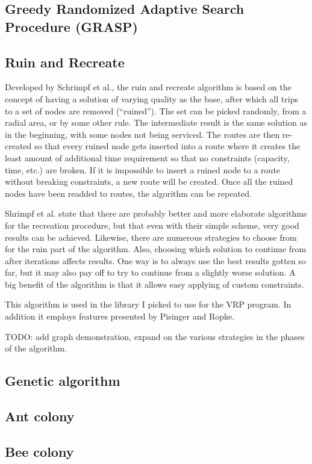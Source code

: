 \subsection{Greedy Randomized Adaptive Search Procedure (GRASP)}

\subsection {Ruin and Recreate}

\label{subsection:ruinandrecreate} 

Developed by Schrimpf et al., the ruin and recreate algorithm is based on the concept of having a solution of varying quality as the base, after which all trips to a set of nodes are removed (``ruined''). The set can be picked randomly, from a radial area, or by some other rule. The intermediate result is the same solution as in the beginning, with some nodes not being serviced. The routes are then re-created so that every ruined node gets inserted into a route where it creates the least amount of additional time requirement so that no constraints (capacity, time, etc.) are broken. If it is impossible to insert a ruined node to a route without breaking constraints, a new route will be created. Once all the ruined nodes have been readded to routes, the algorithm can be repeated. \cite{schrimpf2000record} 

Shrimpf et al. state that there are probably better and more elaborate algorithms for the recreation procedure, but that even with their simple scheme, very good results can be achieved. Likewise, there are numerous strategies to choose from for the ruin part of the algorithm. Also, choosing which solution to continue from after iterations affects results. One way is to always use the best results gotten so far, but it may also pay off to try to continue from a slightly worse solution. A big benefit of the algorithm is that it allows easy applying of custom constraints. \cite{schrimpf2000record} 

This algorithm is used in the library I picked to use for the VRP program. In addition it employs features presented by Pisinger and Ropke\cite{pisinger2007general}.

TODO: add graph demonstration, expand on the various strategies in the phases of the algorithm.

\subsection{Genetic algorithm}

\subsection{Ant colony}

\subsection{Bee colony}